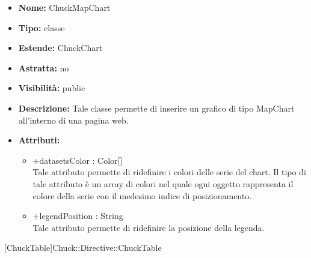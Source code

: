 			
			\begin{itemize}
			\item \textbf{Nome:} ChuckMapChart
			\item \textbf{Tipo:} classe
			
		\item \textbf{Estende:}
		ChuckChart
		\item \textbf{Astratta:}
		no
			\item \textbf{Visibilità:} public
			\item \textbf{Descrizione:} Tale classe permette di inserire un grafico di tipo MapChart all'interno di una pagina web.
			\item \textbf{Attributi:}
				\begin{itemize}
				\setlength{\itemsep}{5pt}
				
					\item[\ding{111}] {+datasetsColor : Color[]} \\ [1mm] Tale attributo permette di ridefinire i colori delle serie del chart.  Il tipo di tale attributo è un array di colori nel quale ogni oggetto rappresenta il colore della serie con il medesimo indice di posizionamento.
					\item[\ding{111}] {+legendPosition : String} \\ [1mm] Tale attributo permette di ridefinire la posizione della legenda.
				\end{itemize}
		
			\end{itemize}

			
			[ChuckTable]{Chuck::Directive::ChuckTable}
			

	
